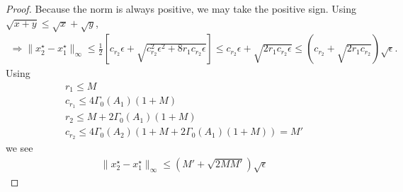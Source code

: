 \documentclass{article}
\theoremstyle{case}
\numberwithin{theorem}{subsection}
\newcommand{\huff}{{\Gamma_0}}
\begin{document}
\begin{proof}
Because the norm is always positive, we may take the positive sign.
Using $\sqrt{x + y} \le \sqrt{x} + \sqrt{y}$,
\begin{align*}
\Longrightarrow \|x_2^{\star} - x_1^{\star}\|_{\infty} \le \frac 1 2 \left[c_{r_2}\epsilon + \sqrt{c_{r_2}^2\epsilon^2 + 8r_1c_{r_2}\epsilon}\right] 
\le c_{r_2}\epsilon + \sqrt{2r_1c_{r_2}\epsilon}
\le \left(c_{r_2} + \sqrt{2r_1c_{r_2}}\right)\sqrt{\epsilon}.
\end{align*}
Using 
\begin{align*}
r_1 \le M \\
c_{r_1} \le 4\huff(A_1)\left(1 + M\right) \\
r_2 \le  M + 2\huff(A_1)\left(1 + M\right) \\
c_{r_2} \le  4\huff(A_2)\left(1 + M + 2\huff(A_1)\left(1 + M\right)\right) = M'
\end{align*}
we see
\begin{align*}
\|x_2^{\star} - x_1^{\star}\|_{\infty} \le \left( M' + \sqrt{2MM'}\right)\sqrt{\epsilon}
\end{align*}

\end{proof}
\end{document}
